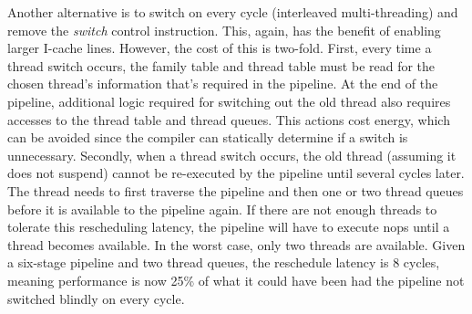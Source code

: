 Another alternative is to switch on every cycle (interleaved multi-threading) and remove the \emph{switch} control instruction. This, again, has the benefit of enabling larger I-cache lines. However, the cost of this is two-fold. First, every time a thread switch occurs, the family table and thread table must be read for the chosen thread's information that's required in the pipeline. At the end of the pipeline, additional logic required for switching out the old thread also requires accesses to the thread table and thread queues. This actions cost energy, which can be avoided since the compiler can statically determine if a switch is unnecessary. Secondly, when a thread switch occurs, the old thread (assuming it does not suspend) cannot be re-executed by the pipeline until several cycles later. The thread needs to first traverse the pipeline and then one or two thread queues before it is available to the pipeline again. If there are not enough threads to tolerate this rescheduling latency, the pipeline will have to execute nops until a thread becomes available. In the worst case, only two threads are available. Given a six-stage pipeline and two thread queues, the reschedule latency is 8 cycles, meaning performance is now 25\% of what it could have been had the pipeline not switched blindly on every cycle.

